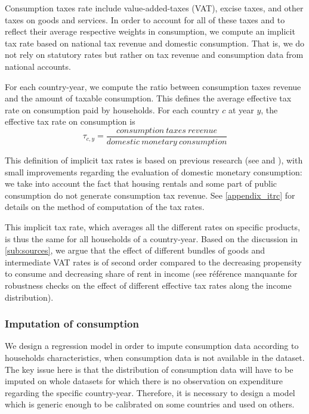 \documentclass[12pt]{article}
\begin{document}
Consumption taxes rate include value-added-taxes (VAT), excise taxes, and other taxes on goods and services. In order to account for all of these taxes and to reflect their average respective weights in consumption, we compute an implicit tax rate based on national tax revenue and domestic consumption. That is, we do not rely on statutory rates but rather on tax revenue and consumption data from national accounts.

For each country-year, we compute the ratio between consumption taxes revenue and the amount of taxable consumption. This defines the average effective tax rate on consumption paid by households. For each country $c$ at year $y$, the effective tax rate on consumption is
\[ \tau_{c,y} = \frac{consumption\ taxes\ revenue}{domestic\ monetary\ consumption} \]

This definition of implicit tax rates is based on previous research (see \cite{mendoza1994effective} and \cite{odonoghue2004}), with small improvements regarding the evaluation of domestic monetary consumption: we take into account the fact that housing rentals and some part of public consumption do not generate consumption tax revenue. See \cref{appendix_itrc} for details on the method of computation of the tax rates.

This implicit tax rate, which averages all the different rates on specific products, is thus the same for all households of a country-year. Based on the discussion in \cref{sub:sources}, we argue that the effect of different bundles of goods and intermediate VAT rates is of second order compared to the decreasing propensity to consume and decreasing share of rent in income (see {\color{red}référence manquante} for robustness checks on the effect of different effective tax rates along the income distribution).

\subsubsection{Imputation of consumption}
\label{subsub:imput}
We design a regression model in order to impute consumption data according to households characteristics, when consumption data is not available in the dataset. The key issue here is that the distribution of consumption data will have to be imputed on whole datasets for which there is no observation on expenditure regarding the specific country-year. Therefore, it is necessary to design a model which is generic enough to be calibrated on some countries and used on others.
\end{document}

